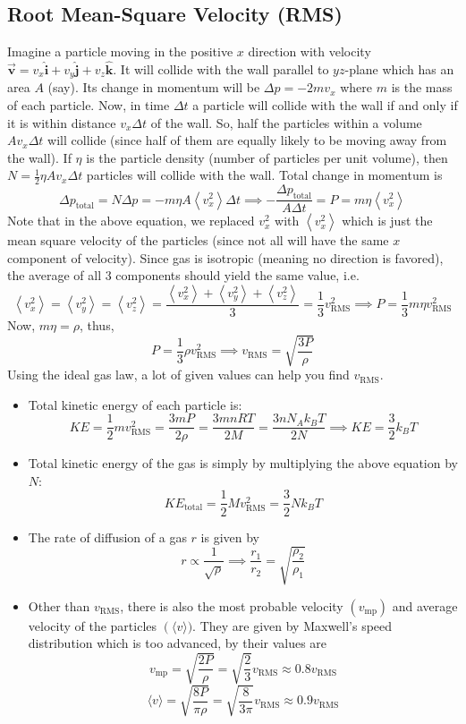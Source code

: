\documentclass{scrartcl}
\begin{document}
    \subsection{Root Mean-Square Velocity (RMS)}
    \quad Imagine a particle moving in the positive $x$ direction with velocity $\vec{\mathbf v}=v_x\hat{\mathbf i}+v_y\hat{\mathbf j}+v_z\hat{\mathbf k}$. It will collide with the wall parallel to $yz$-plane which has an area $A$ (say). Its change in momentum will be $\Delta p=-2mv_x$ where $m$ is the mass of each particle. Now, in time $\Delta t$  a particle will collide with the wall if and only if it is within distance $v_x\Delta t$ of the wall. So, half the particles within a volume $Av_x\Delta t$ will collide (since half of them are equally likely to be moving away from the wall). If $\eta$  is the particle density (number of particles per unit volume), then $N=\frac 12\eta Av_x\Delta t$ particles will collide with the wall. Total change in momentum is \[\Delta p_\text{total}=N\Delta p=-m\eta A\left\langle v_x^2\right\rangle\Delta t\implies-\frac{\Delta p_\text{total}}{A\Delta t}=P=m\eta\left\langle v_x^2\right\rangle\] Note that in the above equation, we replaced $v_x^2$ with $\left\langle v_x^2\right\rangle$ which is just the mean square velocity of the particles (since not all will have the same $x$ component of velocity). Since gas is isotropic (meaning no direction is favored), the average of all 3 components should yield the same value, i.e. \[\left\langle v_x^2\right\rangle=\left\langle v_y^2\right\rangle=\left\langle v_z^2\right\rangle=\frac{\left\langle v_x^2\right\rangle+\left\langle v_y^2\right\rangle+\left\langle v_z^2\right\rangle}3=\frac13v_{\text{RMS}}^2\implies P=\frac13m\eta v_{\text{RMS}}^2\] Now, $m\eta=\rho$, thus, \[P=\frac 13\rho v_{\text{RMS}}^2\implies \boxed{v_\text{RMS}=\sqrt{\frac{3P}\rho}}\] Using the ideal gas law, a lot of given values can help you find $v_\text{RMS}$.
    \begin{itemize}
        \item Total kinetic energy of each particle is: \[\boxed{KE=\frac12mv_\text{RMS}^2}=\frac{3mP}{2\rho}=\frac{3mnRT}{2M}=\frac{3nN_Ak_BT}{2N}\implies\boxed{KE=\frac32k_BT}\]
        \item Total kinetic energy of the gas is simply by multiplying the above equation by $N$: \[KE_\text{total}=\frac12Mv_{\text{RMS}}^2=\frac32Nk_BT\]
        \item The rate of diffusion of a gas $r$ is given by \[r\propto\frac1{\sqrt\rho}\implies\frac{r_1}{r_2}=\sqrt{\frac{\rho_2}{\rho_1}}\]
        \item Other than $v_\text{RMS}$, there is also the most probable velocity $\left(v_\text{mp}\right)$ and average velocity of the particles $\left(\langle v\rangle)$. They are given by Maxwell's speed distribution which is too advanced, by their values are \[v_\text{mp}=\sqrt{\frac{2P}\rho}=\sqrt{\frac23}v_\text{RMS}\approx0.8v_\text{RMS}\]\[\langle v\rangle=\sqrt{\frac{8P}{\pi\rho}}=\sqrt{\frac8{3\pi}}v_\text{RMS}\approx0.9v_\text{RMS}\]
    \end{itemize}
\end{document}
